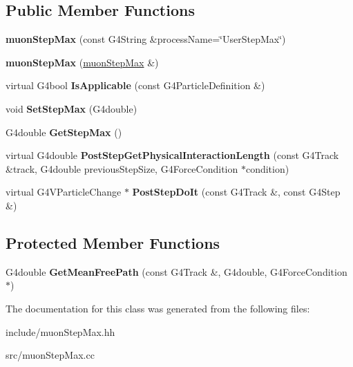 \subsection*{Public Member Functions}
\begin{DoxyCompactItemize}
\item 
\mbox{\label{classmuonStepMax_ae51ff3435957e85c269ef9d327b75482}} 
{\bfseries muon\+Step\+Max} (const G4\+String \&process\+Name=\char`\"{}User\+Step\+Max\char`\"{})
\item 
\mbox{\label{classmuonStepMax_a41ccffbc62f636553f3d9143e98b2079}} 
{\bfseries muon\+Step\+Max} (\hyperlink{classmuonStepMax}{muon\+Step\+Max} \&)
\item 
\mbox{\label{classmuonStepMax_a4437a2282448452a419149cd8d8f7495}} 
virtual G4bool {\bfseries Is\+Applicable} (const G4\+Particle\+Definition \&)
\item 
\mbox{\label{classmuonStepMax_a449cd30e5d5284d56a0dc10bf831e4db}} 
void {\bfseries Set\+Step\+Max} (G4double)
\item 
\mbox{\label{classmuonStepMax_adf76383939936db76e310b661b4f332f}} 
G4double {\bfseries Get\+Step\+Max} ()
\item 
\mbox{\label{classmuonStepMax_aea1aeac21f0095b44bedf878789b9d0d}} 
virtual G4double {\bfseries Post\+Step\+Get\+Physical\+Interaction\+Length} (const G4\+Track \&track, G4double previous\+Step\+Size, G4\+Force\+Condition $\ast$condition)
\item 
\mbox{\label{classmuonStepMax_af3da1fe21a53518e52fea709a52173fd}} 
virtual G4\+V\+Particle\+Change $\ast$ {\bfseries Post\+Step\+Do\+It} (const G4\+Track \&, const G4\+Step \&)
\end{DoxyCompactItemize}
\subsection*{Protected Member Functions}
\begin{DoxyCompactItemize}
\item 
\mbox{\label{classmuonStepMax_a792f2c77129ec1eeae9ac56902ec6e90}} 
G4double {\bfseries Get\+Mean\+Free\+Path} (const G4\+Track \&, G4double, G4\+Force\+Condition $\ast$)
\end{DoxyCompactItemize}


The documentation for this class was generated from the following files\+:\begin{DoxyCompactItemize}
\item 
include/muon\+Step\+Max.\+hh\item 
src/muon\+Step\+Max.\+cc\end{DoxyCompactItemize}
